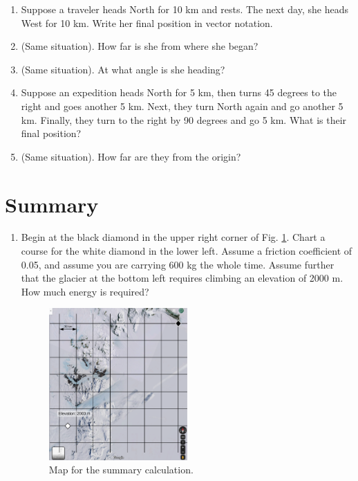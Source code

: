 \documentclass[10pt]{article}
\begin{document}
\begin{enumerate}
\item Suppose a traveler heads North for 10 km and rests.  The next day, she heads West for 10 km.  Write her final position in vector notation. \\ \vspace{1cm}
\item (Same situation).  How far is she from where she began? \\ \vspace{1cm}
\item (Same situation).  At what angle is she heading? \\ \vspace{1cm}
\item Suppose an expedition heads North for 5 km, then turns 45 degrees to the right and goes another 5 km.  Next, they turn North again and go another 5 km.  Finally, they turn to the right by 90 degrees and go 5 km.  What is their final position? \\ \vspace{2cm}
\item (Same situation).  How far are they from the origin? \\ \vspace{1cm}
\end{enumerate}

\section{Summary}

\begin{enumerate}
\item Begin at the black diamond in the upper right corner of Fig. \ref{fig:maze}.  Chart a course for the white diamond in the lower left. Assume a friction coefficient of 0.05, and assume you are carrying 600 kg the whole time.  Assume further that the glacier at the bottom left requires climbing an elevation of 2000 m.  How much energy is required?
\begin{figure}[hb]
\centering
\includegraphics[width=0.5\textwidth]{glacier2.pdf}
\caption{\label{fig:maze} Map for the summary calculation.}
\end{figure}
\end{enumerate}
\end{document}
